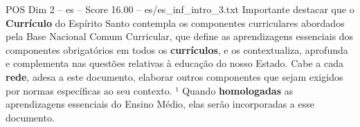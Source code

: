 \begin{textsample}{POS Dim 2 – es – Score 16.00 – es/es\_inf\_intro\_3.txt}
Importante destacar que o \textbf{Currículo} do Espírito Santo contempla os componentes curriculares abordados pela Base Nacional Comum Curricular, que define as aprendizagens essenciais dos componentes obrigatórios em todos os \textbf{currículos}, e os contextualiza, aprofunda e complementa nas questões relativas à educação do nosso Estado.
Cabe a cada \textbf{rede}, adesa a este documento, elaborar outros componentes que sejam exigidos por normas específicas ao seu contexto. ¹ Quando \textbf{homologadas} as aprendizagens essenciais do Ensino Médio, elas serão incorporadas a esse documento.

\end{textsample}
